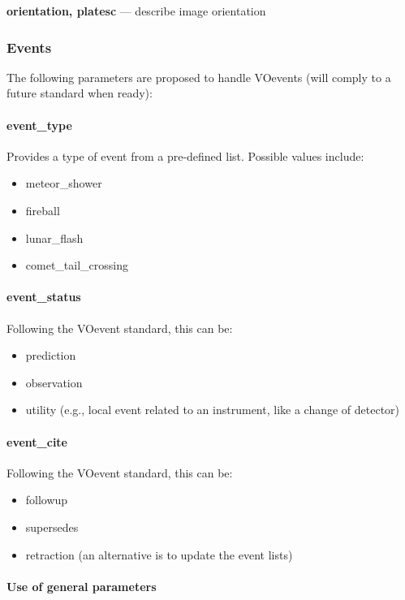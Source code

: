 \documentclass[11pt,a4paper]{ivoa}
\begin{document}
\textbf{orientation, platesc} --- describe image orientation

\subsubsection{Events}

The following parameters are proposed to handle VOevents
(will comply to a future standard when ready):

\paragraph{event\_type}

Provides a type of event from a pre-defined list.
Possible values include:

\begin{itemize}
\item meteor\_shower
\item fireball
\item lunar\_flash
\item comet\_tail\_crossing
\end{itemize}

\paragraph{event\_status}

Following the VOevent standard, this can be:

\begin{itemize}
\item prediction
\item observation
\item utility (e.g., local event related to an instrument,
      like a change of detector)
\end{itemize}

\paragraph{event\_cite}

Following the VOevent standard, this can be:

\begin{itemize}
\item followup
\item supersedes
\item retraction (an alternative is to update the event lists)
\end{itemize}

\paragraph{Use of general parameters\textbf{ }}
\end{document}
